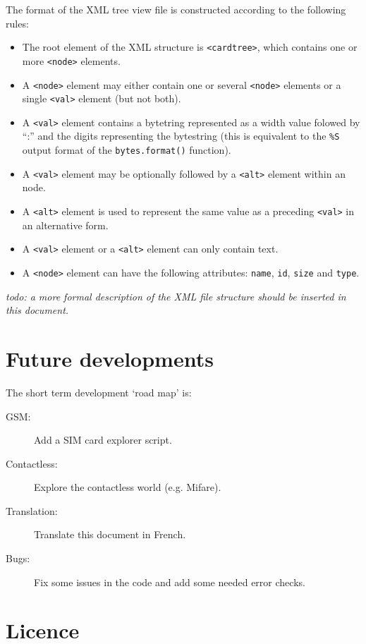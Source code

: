 \documentclass[11pt]{report}
\newcommand{\syn}[1]{\texttt{#1}}
\begin{document}
\noindent
The format of the XML tree view file is constructed according to the following rules:
\begin{itemize}
\item{The root element of the XML structure is \syn{<cardtree>}, which contains one or more \syn{<node>} elements.}
\item{A \syn{<node>} element may either contain one or several \syn{<node>} elements or a single \syn{<val>} element (but not both).}
\item{A \syn{<val>} element contains a bytetring represented as a width value folowed by ``:'' and the digits representing the bytestring (this is equivalent to the \syn{\%S} output format of the \syn{bytes.format()} function).}
\item{A \syn{<val>} element may be optionally followed by a \syn{<alt>} element within an node.}
\item{A \syn{<alt>} element is used to represent the same value as a preceding \syn{<val>} in an alternative form.}
\item{A \syn{<val>} element or a \syn{<alt>} element can only contain text.}
\item{A \syn{<node>} element can have the following attributes: \syn{name}, \syn{id}, \syn{size} and \syn{type}.}
\end{itemize}

\noindent
\textit{todo: a more formal description of the XML file structure should be inserted in this document.}

\chapter{Future developments}

The short term development `road map' is:
\begin{description}
\item[GSM:]{Add a SIM card explorer script.}
\item[Contactless:]{Explore the contactless world (e.g. Mifare).}
\item[Translation:]{Translate this document in French.}
\item[Bugs:]{Fix some issues in the code and add some needed error checks.}
\end{description}

\chapter{Licence}
\label{chapter:licence}
\end{document}
